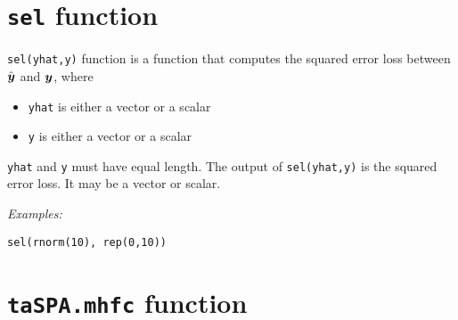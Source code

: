 \documentclass[12pt]{article}
\begin{document}
\section{\texttt{sel} function}

\texttt{sel(yhat,y)} function is a function that computes the squared error loss between   $\hat{\boldsymbol{y}}$ and  $\boldsymbol{y}$, where 
\begin{itemize}
	\item \texttt{yhat} is either a vector or a scalar
	\item \texttt{y} is either a vector or a scalar
\end{itemize}
\texttt{yhat} and \texttt{y} must have equal length. The output of \texttt{sel(yhat,y)} is the squared error loss. It may be a vector or scalar.

\emph{Examples:}
\begin{verbatim}
sel(rnorm(10), rep(0,10))
\end{verbatim}


\section{\texttt{taSPA.mhfc} function}
\end{document}
